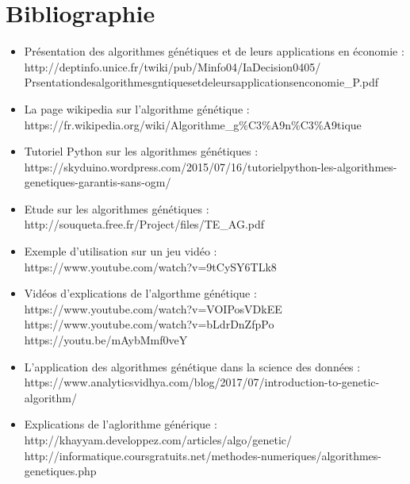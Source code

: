 \documentclass[a4paper,11pt]{article}
\begin{document}
	\section{Bibliographie}
	\begin{itemize}
		\item Présentation des algorithmes génétiques et de leurs applications en économie :\\
		http://deptinfo.unice.fr/twiki/pub/Minfo04/IaDecision0405/ \\
		Prsentationdesalgorithmesgntiquesetdeleursapplicationsenconomie\_P.pdf\\

		\item La page wikipedia sur l'algorithme génétique : \\
		https://fr.wikipedia.org/wiki/Algorithme\_g$\%$C3$\%$A9n$\%$C3$\%$A9tique\\

		\item Tutoriel Python sur les algorithmes génétiques :\\
		https://skyduino.wordpress.com/2015/07/16/tutorielpython-les-algorithmes-genetiques-garantis-sans-ogm/\\

		\item Etude sur les algorithmes génétiques :\\
		http://souqueta.free.fr/Project/files/TE\_AG.pdf
		
		\item Exemple d'utilisation sur un jeu vidéo :\\
		https://www.youtube.com/watch?v=9tCySY6TLk8\\

		\item Vidéos d'explications de l'algorthme génétique :\\
		https://www.youtube.com/watch?v=VOIPosVDkEE\\
		https://www.youtube.com/watch?v=bLdrDnZfpPo\\
		https://youtu.be/mAybMmf0veY\\

		\item L'application des algorithmes génétique dans la science des données :\\
		https://www.analyticsvidhya.com/blog/2017/07/introduction-to-genetic-algorithm/ 

		\item Explications de l’aglorithme générique :\\
		http://khayyam.developpez.com/articles/algo/genetic/\\
		http://informatique.coursgratuits.net/methodes-numeriques/algorithmes-genetiques.php


\end{itemize}
\end{document}
